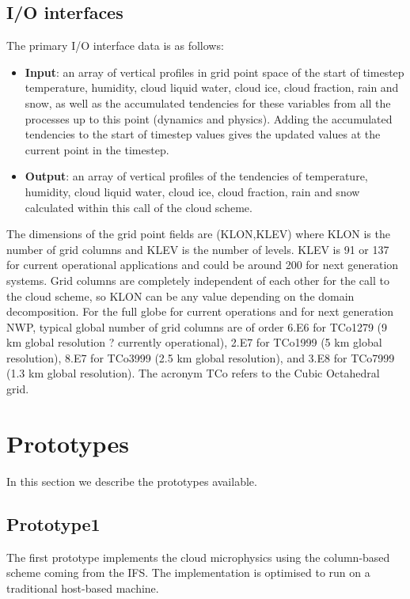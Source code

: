 \documentclass[
a4paper,     %
12pt,        %
article,
onecolumn,   %
openany,     %
]{memoir}
\begin{document}
\subsection{I/O interfaces}
The primary I/O interface data is as follows:
%
\begin{itemize}
\item \textbf{Input}: an array of vertical profiles in grid point space of the start of 
timestep temperature, humidity, cloud liquid water, cloud ice, cloud fraction, rain 
and snow, as well as the accumulated tendencies for these variables from all the 
processes up to this point (dynamics and physics). Adding the accumulated tendencies 
to the start of timestep values gives the updated values at the current point in the 
timestep.
\item \textbf{Output}: an array of vertical profiles of the tendencies of temperature, 
humidity, cloud liquid water, cloud ice, cloud fraction, rain and snow calculated 
within this call of the cloud scheme.
\end{itemize}
%
The dimensions of the grid point fields are (KLON,KLEV) where KLON is the number 
of grid columns and KLEV is the number of levels. KLEV is 91 or 137 for current operational 
applications and could be around 200 for next generation systems. Grid columns are 
completely independent of each other for the call to the cloud scheme, so KLON can 
be any value depending on the domain decomposition. For the full globe for current 
operations and for next generation NWP, typical global number of grid columns are 
of order 6.E6 for TCo1279 (9 km global resolution ? currently operational), 2.E7 for 
TCo1999 (5 km global resolution), 8.E7 for TCo3999 (2.5 km global resolution), and 
3.E8 for TCo7999 (1.3 km global resolution). The acronym TCo refers to the Cubic 
Octahedral grid.



\section{Prototypes}
In this section we describe the prototypes available.

\subsection{Prototype1}
The first prototype implements the cloud microphysics using 
the column-based scheme coming from the IFS. The implementation 
is optimised to run on a traditional host-based machine.
\end{document}
